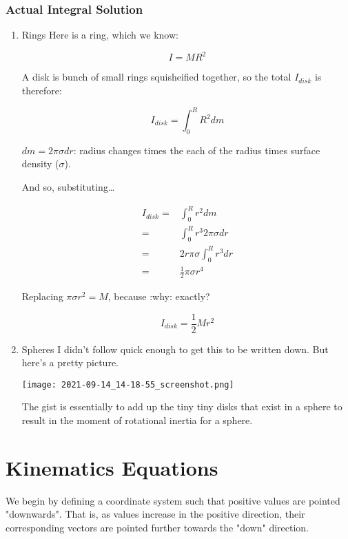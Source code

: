 \documentclass[letterpaper]{article}
\begin{document}
\subsubsection{Actual Integral Solution}
\label{sec:orgbde6e98}

\begin{enumerate}
\item Rings
\label{sec:org04f5d1c}
Here is a ring, which we know:

\begin{equation}
    I= MR^2
\end{equation}

A disk is bunch of small rings squisheified together, so the total \(I_{disk}\) is therefore:

\begin{equation}
    I_{disk} = \int^R_0 R^2 dm
\end{equation}

\(dm = 2\pi \sigma dr\): radius changes times the each of the radius times surface density (\(\sigma\)).

And so, substituting\ldots{}

\begin{align}
    I_{disk} =& \int^R_0 r^2 dm \\
    =& \int^R_0 r^3 2 \pi \sigma dr \\
    =& 2r\pi\sigma \int^R_0 r^3 dr \\
    =& \frac{1}{2}\pi\sigma r^4
\end{align}

Replacing \(\pi \sigma r^2 = M\), because :why: exactly?

\begin{equation}
    I_{disk} = \frac{1}{2}Mr^2
\end{equation}

\item Spheres
\label{sec:org21d5f8a}
I didn't follow quick enough to get this to be written down. But here's a pretty picture.


\begin{center}
\texttt{[image: 2021-09-14\_14-18-55\_screenshot.png]}
\end{center}

The gist is essentially to add up the tiny tiny disks that exist in a sphere to result in the moment of rotational inertia for a sphere.
\end{enumerate}


\section{Kinematics Equations}
\label{sec:orgd18150a}
We begin by defining a coordinate system such that positive values are pointed "downwards". That is, as values increase in the positive direction, their corresponding vectors are pointed further towards the "down" direction.
\end{document}
